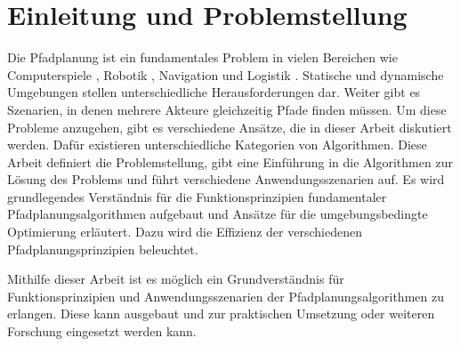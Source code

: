 \chapter{Einleitung und Problemstellung}

Die Pfadplanung ist ein fundamentales Problem in vielen Bereichen wie Computerspiele \cite{compare}, Robotik \cite{latombe}, Navigation und Logistik \cite{Botea.2011}. Statische und dynamische Umgebungen stellen unterschiedliche Herausforderungen dar. Weiter gibt es Szenarien, in denen mehrere Akteure gleichzeitig Pfade finden müssen. Um diese Probleme anzugehen, gibt es verschiedene Ansätze, die in dieser Arbeit diskutiert werden. Dafür existieren unterschiedliche Kategorien von Algorithmen. Diese Arbeit definiert die Problemstellung, gibt eine Einführung in die Algorithmen zur Lösung des Problems und führt verschiedene Anwendungsszenarien auf. Es wird grundlegendes Verständnis für die Funktionsprinzipien fundamentaler Pfadplanungsalgorithmen aufgebaut und Ansätze für die umgebungsbedingte Optimierung erläutert. Dazu wird die Effizienz der verschiedenen Pfadplanungsprinzipien beleuchtet.




Mithilfe dieser Arbeit ist es möglich ein Grundverständnis für Funktionsprinzipien und Anwendungsszenarien der Pfadplanungsalgorithmen zu erlangen. Diese kann ausgebaut und zur praktischen
Umsetzung oder weiteren Forschung eingesetzt werden kann.

